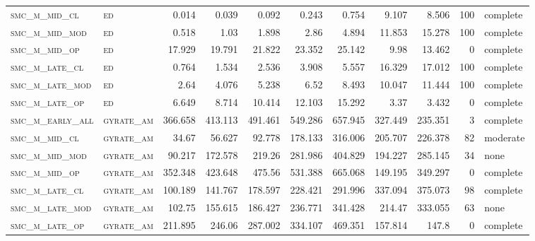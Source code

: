 \begin{landscape}
\begin{center}
\begin{footnotesize}
\begin{longtable}{llrrrrr|rrr}
\textsc{smc\_m\_mid\_cl   } & \textsc{ed        }   & 0.014    & 0.039    & 0.092    & 0.243    & 0.754    & 9.107       & 8.506         & 100           & complete \\
\textsc{smc\_m\_mid\_mod  } & \textsc{ed        }   & 0.518    & 1.03     & 1.898    & 2.86     & 4.894    & 11.853      & 15.278        & 100           & complete \\
\textsc{smc\_m\_mid\_op   } & \textsc{ed        }   & 17.929   & 19.791   & 21.822   & 23.352   & 25.142   & 9.98        & 13.462        & 0             & complete     \\
\textsc{smc\_m\_late\_cl  } & \textsc{ed        }   & 0.764    & 1.534    & 2.536    & 3.908    & 5.557    & 16.329      & 17.012        & 100           & complete \\
\textsc{smc\_m\_late\_mod } & \textsc{ed        }   & 2.64     & 4.076    & 5.238    & 6.52     & 8.493    & 10.047      & 11.444        & 100           & complete \\
\textsc{smc\_m\_late\_op  } & \textsc{ed        }   & 6.649    & 8.714    & 10.414   & 12.103   & 15.292   & 3.37        & 3.432         & 0             & complete     \\
\textsc{smc\_m\_early\_all} & \textsc{gyrate\_am}   & 366.658  & 413.113  & 491.461  & 549.286  & 657.945  & 327.449     & 235.351       & 3             & complete \\
\textsc{smc\_m\_mid\_cl   } & \textsc{gyrate\_am}   & 34.67    & 56.627   & 92.778   & 178.133  & 316.006  & 205.707     & 226.378       & 82            & moderate \\
\textsc{smc\_m\_mid\_mod  } & \textsc{gyrate\_am}   & 90.217   & 172.578  & 219.26   & 281.986  & 404.829  & 194.227     & 285.145       & 34            & none \\
\textsc{smc\_m\_mid\_op   } & \textsc{gyrate\_am}   & 352.348  & 423.648  & 475.56   & 531.388  & 665.068  & 149.195     & 349.297       & 0             & complete     \\
\textsc{smc\_m\_late\_cl  } & \textsc{gyrate\_am}   & 100.189  & 141.767  & 178.597  & 228.421  & 291.996  & 337.094     & 375.073       & 98            & complete \\
\textsc{smc\_m\_late\_mod } & \textsc{gyrate\_am}   & 102.75   & 155.615  & 186.427  & 236.771  & 341.428  & 214.47      & 333.055       & 63            & none \\
\textsc{smc\_m\_late\_op  } & \textsc{gyrate\_am}   & 211.895  & 246.06   & 287.002  & 334.107  & 469.351  & 157.814     & 147.8         & 0             & complete     \\

\end{longtable}
\end{footnotesize}
\end{center}
\end{landscape}
